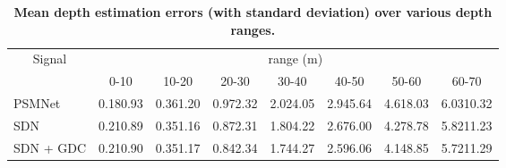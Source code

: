 \begin{table}[t]
	\centering
	\caption{\textbf{Mean depth estimation errors (with standard deviation) over various depth ranges.} \label{tbDepthValue_mean}}
	\tabcolsep 2pt
	\begin{tabular}{l|c|c|c|c|c|c|c}
		\multicolumn{1}{c|}{\multirow{2}{*}{Signal}} & \multicolumn{7}{c}{range (m)}                                                                                                                                                                         \\ \cline{2-8}
		\multicolumn{1}{c|}{}                        & \multicolumn{1}{c|}{0-10} & \multicolumn{1}{c|}{10-20} & \multicolumn{1}{c|}{20-30} & \multicolumn{1}{c|}{30-40} & \multicolumn{1}{c|}{40-50} & \multicolumn{1}{c|}{50-60} & \multicolumn{1}{c}{60-70} \\ \hline
		PSMNet                       & 0.180.93                      & 0.361.20                     & 0.972.32                     & 2.024.05                     & 2.945.64                     & 4.618.03                     & 6.0310.32                    \\
		SDN                                          & 0.210.89                    & 0.351.16                     & 0.872.31                     & 1.804.22                     & 2.676.00                     & 4.278.78                     & 5.8211.23                    \\
		SDN + GDC                                    & 0.210.90                    & 0.351.17                     & 0.842.34                     & 1.744.27                     & 2.596.06                     & 4.148.85                     & 5.7211.29                    \\ \hline
	\end{tabular}
\end{table}


